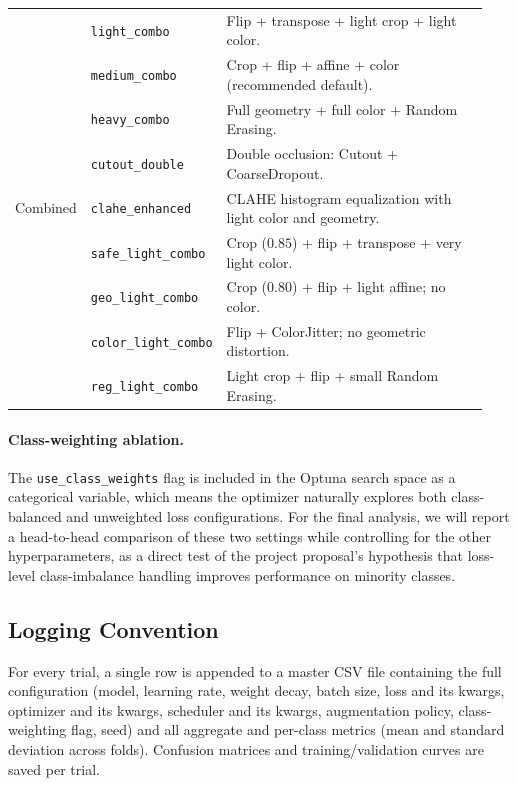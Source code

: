 \documentclass[conference]{IEEEtran}
\begin{document}
\begin{table}[t]
\begin{tabular}{p{0.16\linewidth}p{0.19\linewidth}p{0.59\linewidth}}
\midrule
\multirow{9}{*}{Combined}
                               & \texttt{light\_combo}         & Flip + transpose + light crop + light color. \\
                               & \texttt{medium\_combo}        & Crop + flip + affine + color (recommended default). \\
                               & \texttt{heavy\_combo}         & Full geometry + full color + Random Erasing. \\
                               & \texttt{cutout\_double}       & Double occlusion: Cutout + CoarseDropout. \\
                               & \texttt{clahe\_enhanced}      & CLAHE histogram equalization with light color and geometry. \\
                               & \texttt{safe\_light\_combo}   & Crop ($0.85$) + flip + transpose + very light color. \\
                               & \texttt{geo\_light\_combo}    & Crop ($0.80$) + flip + light affine; no color. \\
                               & \texttt{color\_light\_combo}  & Flip + ColorJitter; no geometric distortion. \\
                               & \texttt{reg\_light\_combo}    & Light crop + flip + small Random Erasing. \\
\bottomrule
\end{tabular}
\end{table}

\paragraph{Class-weighting ablation.}
The \texttt{use\_class\_weights} flag is included in the Optuna search space as a categorical variable, which means the optimizer naturally explores both class-balanced and unweighted loss configurations. For the final analysis, we will report a head-to-head comparison of these two settings while controlling for the other hyperparameters, as a direct test of the project proposal's hypothesis that loss-level class-imbalance handling improves performance on minority classes.

\subsection{Logging Convention}
For every trial, a single row is appended to a master CSV file containing the full configuration (model, learning rate, weight decay, batch size, loss and its kwargs, optimizer and its kwargs, scheduler and its kwargs, augmentation policy, class-weighting flag, seed) and all aggregate and per-class metrics (mean and standard deviation across folds). Confusion matrices and training/validation curves are saved per trial.
\end{document}
